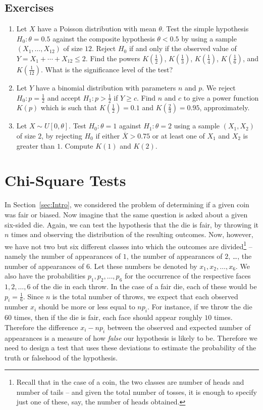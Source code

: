 \documentclass[svgnames, a5paper]{article}
\theoremstyle{definition}
\theoremstyle{remark}
\begin{document}
\subsection{Exercises}\label{subsec:Exercises1}
\begin{enumerate}
\item Let $X$ have a Poisson distribution with mean $\theta$. Test the simple hypothesis $H_0 \colon \theta = 0.5$ against the composite hypothesis $\theta < 0.5$ by using a sample $(X_1, \ldots, X_{12})$ of size $12$. Reject $H_0$ if and only if the observed value of $Y = X_1 + \cdots + X_{12} \le 2$. Find the powers $K(\frac 1 2)$, $K(\frac 1 3)$, $K(\frac 1 4)$, $K(\frac 1 6)$, and $K(\frac 1 {12})$. What is the significance level of the test?

\item Let $Y$ have a binomial distribution with parameters $n$ and $p$. We reject $H_0 \colon p = \frac 1 2$ and accept $H_1 \colon p > \frac 1 2$ if $Y \ge c$. Find $n$ and $c$ to give a power function $K(p)$ which is such that $K(\frac 1 2) = 0.1$ and $K(\frac 2 3) = 0.95$, approximately.

\item Let $X \sim U[0, \theta]$. Test $H_0 \colon \theta = 1$ against $H_1 \colon \theta = 2$ using a sample $(X_1, X_2)$ of size $2$, by rejecting $H_0$ if either $\overline X > 0.75$ or at least one of $X_1$ and $X_2$ is greater than $1$. Compute $K(1)$ and $K(2)$.
\end{enumerate}

\section{Chi-Square Tests}\label{sec:Chi-square}
In Section~\ref{sec:Intro}, we considered the problem of determining if a given coin was fair or biased. Now imagine that the same question is asked about a given six-sided die. Again, we can test the hypothesis that the die is fair, by throwing it $n$ times and observing the distribution of the resulting outcomes. Now, however, we have not two but six different classes into which the outcomes are divided\footnote{
	Recall that in the case of a coin, the two classes are number of heads and number of tails -- and given the total number of tosses, it is enough to specify just one of these, say, the number of heads obtained.
} -- namely the number of appearances of $1$, the number of appearances of $2$, \ldots, the number of appearances of $6$. Let these numbers be denoted by $x_1, x_2, \ldots, x_6$. We also have the probabilities $p_1, p_2, \ldots, p_6$ for the occurrence of the respective faces $1, 2, \ldots, 6$ of the die in each throw. In the case of a fair die, each of these would be $p_i = \frac 1 6$. Since $n$ is the total number of throws, we expect that each observed number $x_i$ should be more or less equal to $np_i$. For instance, if we throw the die $60$ times, then if the die is fair, each face should appear roughly $10$ times. Therefore the difference $x_i - np_i$ between the observed and expected number of appearances is a measure of how \emph{false} our hypothesis is likely to be. Therefore we need to design a test that uses these deviations to estimate the probability of the truth or falsehood of the hypothesis.
\end{document}
